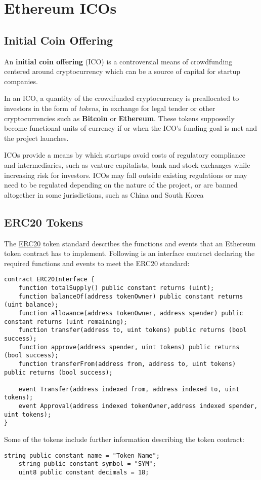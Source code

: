 \label{Chapter4}

\chapter{Ethereum ICOs}

\section{Initial Coin Offering}
An \textbf{initial coin offering} (ICO) is a controversial means of crowdfunding centered around cryptocurrency \cite{chohan2017initial,teutsch2017interactive} which can be a source of capital for startup companies. 

In an ICO, a quantity of the crowdfunded cryptocurrency is preallocated to investors in the form of \textit{tokens}, in exchange for legal tender or other cryptocurrencies such as \textbf{Bitcoin} or \textbf{Ethereum}. These tokens supposedly become functional units of currency if or when the ICO's funding goal is met and the project launches.

ICOs provide a means by which startups avoid costs of regulatory compliance and intermediaries, such as venture capitalists, bank and stock exchanges while increasing risk for investors. ICOs may fall outside existing regulations or may need to be regulated depending on the nature of the project, or are banned altogether in some jurisdictions, such as China and South Korea

\section{ERC20 Tokens}
The \href{https://github.com/ethereum/EIPs/blob/master/EIPS/eip-20.md}{ERC20} token standard \cite{vogelsteller2015erc} describes the functions and events that an Ethereum token contract has to implement. \newline
Following is an interface contract declaring the required functions and events to meet the ERC20 standard:
\begin{lstlisting}[language=Solidity]
contract ERC20Interface {
    function totalSupply() public constant returns (uint);
    function balanceOf(address tokenOwner) public constant returns (uint balance);
    function allowance(address tokenOwner, address spender) public constant returns (uint remaining);
    function transfer(address to, uint tokens) public returns (bool success);
    function approve(address spender, uint tokens) public returns (bool success);
    function transferFrom(address from, address to, uint tokens) public returns (bool success);

    event Transfer(address indexed from, address indexed to, uint tokens);
    event Approval(address indexed tokenOwner,address indexed spender, uint tokens);
}
\end{lstlisting}
Some of the tokens include further information describing the token contract:
\begin{lstlisting}[language=Solidity]
    string public constant name = "Token Name";
    string public constant symbol = "SYM";
    uint8 public constant decimals = 18;
\end{lstlisting}


